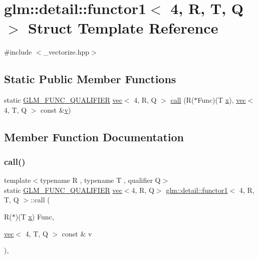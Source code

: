 \hypertarget{structglm_1_1detail_1_1functor1_3_014_00_01_r_00_01_t_00_01_q_01_4}{}\section{glm\+:\+:detail\+:\+:functor1$<$ 4, R, T, Q $>$ Struct Template Reference}
\label{structglm_1_1detail_1_1functor1_3_014_00_01_r_00_01_t_00_01_q_01_4}


{\ttfamily \#include $<$\+\_\+vectorize.\+hpp$>$}

\subsection*{Static Public Member Functions}
\begin{DoxyCompactItemize}
\item 
static \hyperlink{setup_8hpp_a33fdea6f91c5f834105f7415e2a64407}{G\+L\+M\+\_\+\+F\+U\+N\+C\+\_\+\+Q\+U\+A\+L\+I\+F\+I\+ER} \hyperlink{structglm_1_1vec}{vec}$<$ 4, R, Q $>$ \hyperlink{structglm_1_1detail_1_1functor1_3_014_00_01_r_00_01_t_00_01_q_01_4_a2cedf8c93f72d6dd2f94d7e81eb2ce69}{call} (R($\ast$Func)(T \hyperlink{_s_d_l__opengl_8h_ad0e63d0edcdbd3d79554076bf309fd47}{x}), \hyperlink{structglm_1_1vec}{vec}$<$ 4, T, Q $>$ const \&\hyperlink{_s_d_l__opengl_8h_a10a82eabcb59d2fcd74acee063775f90}{v})
\end{DoxyCompactItemize}


\subsection{Member Function Documentation}
\mbox{\label{structglm_1_1detail_1_1functor1_3_014_00_01_r_00_01_t_00_01_q_01_4_a2cedf8c93f72d6dd2f94d7e81eb2ce69}} 
\subsubsection{\texorpdfstring{call()}{call()}}
{\footnotesize\ttfamily template$<$typename R , typename T , qualifier Q$>$ \\
static \hyperlink{setup_8hpp_a33fdea6f91c5f834105f7415e2a64407}{G\+L\+M\+\_\+\+F\+U\+N\+C\+\_\+\+Q\+U\+A\+L\+I\+F\+I\+ER} \hyperlink{structglm_1_1vec}{vec}$<$4, R, Q$>$ \hyperlink{structglm_1_1detail_1_1functor1}{glm\+::detail\+::functor1}$<$ 4, R, T, Q $>$\+::call (\begin{DoxyParamCaption}\item[{R($\ast$)(T \hyperlink{_s_d_l__opengl_8h_ad0e63d0edcdbd3d79554076bf309fd47}{x})}]{Func,  }\item[{\hyperlink{structglm_1_1vec}{vec}$<$ 4, T, Q $>$ const \&}]{v }\end{DoxyParamCaption})\hspace{0.3cm}{\ttfamily [inline]}, {\ttfamily [static]}}



